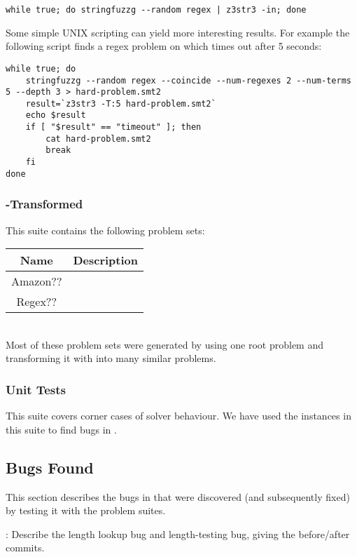         {\scriptsize\begin{verbatim}
while true; do stringfuzzg --random regex | z3str3 -in; done\end{verbatim}}

        Some simple UNIX scripting can yield more interesting results. For example the following script finds a regex problem on which \us{} times out after 5 seconds:

        {\scriptsize\begin{verbatim}while true; do
    stringfuzzg --random regex --coincide --num-regexes 2 --num-terms 5 --depth 3 > hard-problem.smt2
    result=`z3str3 -T:5 hard-problem.smt2`
    echo $result
    if [ "$result" == "timeout" ]; then
        cat hard-problem.smt2
        break
    fi
done\end{verbatim}}

    \subsubsection{\fuzzer{}-Transformed}

        This suite contains the following problem sets: \\

        \begin{tabular}{|c|c|}
            \hline
            \textbf{Name} & \textbf{Description} \\ \hline
            Amazon??      & \todo{} \\ \hline
            Regex??       & \todo{} \\ \hline
        \end{tabular}

        \hfill \\

        Most of these problem sets were generated by using one root problem and transforming it with \transformer{} into many similar problems.

    \subsubsection{Unit Tests}

        This suite covers corner cases of solver behaviour. We have used the instances in this suite to find bugs in \us{}.

    \subsection{Bugs Found}

        This section describes the bugs in \us{} that were discovered (and subsequently fixed) by testing it with the \fuzzer{} problem suites.

        \todo{}: Describe the length lookup bug and length-testing bug, giving the before/after commits.
